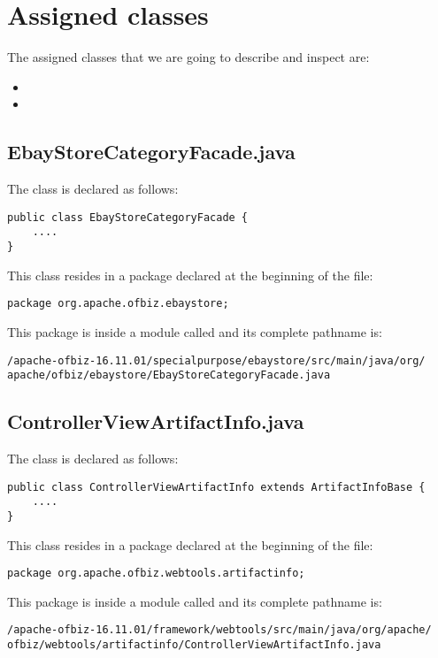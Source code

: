 \chapter{Assigned classes}
The assigned classes that we are going to describe and inspect are:
\begin{itemize}
\item {}
\item {}
\end{itemize}

\section{EbayStoreCategoryFacade.java}
The class is declared as follows:

{\renewcommand\thelstnumber{%
\ifnum\value{lstnumber}=59 345\else\arabic{lstnumber}\fi}
\begin{lstlisting}[firstnumber=57, caption={EbayStoreCategoryFacade declaration}]
public class EbayStoreCategoryFacade {
    ....
}
\end{lstlisting}}

This class resides in a package declared at the beginning of the file:
\begin{lstlisting}[firstnumber=19, caption={Package declaration}]
package org.apache.ofbiz.ebaystore;
\end{lstlisting}

This package is inside a module called  and its complete pathname is:
\begin{lstlisting}[numbers=none]
/apache-ofbiz-16.11.01/specialpurpose/ebaystore/src/main/java/org/ apache/ofbiz/ebaystore/EbayStoreCategoryFacade.java
\end{lstlisting}

\section{ControllerViewArtifactInfo.java}
The class is declared as follows:
{\renewcommand\thelstnumber{%
\ifnum\value{lstnumber}=37 129\else\arabic{lstnumber}\fi}
\begin{lstlisting}[firstnumber=35, caption={ControllerViewArtifactInfo declaration}]
public class ControllerViewArtifactInfo extends ArtifactInfoBase {
    ....
}
\end{lstlisting}}

This class resides in a package declared at the beginning of the file:
\begin{lstlisting}[firstnumber=19, caption={Package declaration}]
package org.apache.ofbiz.webtools.artifactinfo;
\end{lstlisting}

This package is inside a module called  and its complete pathname is:
\begin{lstlisting}[numbers=none]
/apache-ofbiz-16.11.01/framework/webtools/src/main/java/org/apache/ ofbiz/webtools/artifactinfo/ControllerViewArtifactInfo.java
\end{lstlisting}
